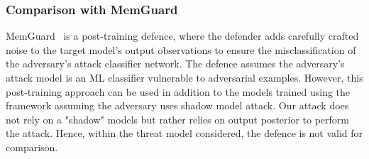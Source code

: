 

\subsubsection{Comparison with MemGuard}

MemGuard~\cite{10.1145/3319535.3363201} is a post-training defence, where the defender adds carefully crafted noise to the target model's output observations to ensure the misclassification of the adversary's attack classifier network.
The defence assumes the adversary's attack model is an ML classifier vulnerable to adversarial examples.
However, this post-training approach can be used in addition to the models trained using the \method\hspace{0.02in} framework assuming the adversary uses shadow model attack.
Our attack does not rely on a "shadow" models but rather relies on output posterior to perform the attack.
Hence, within the threat model considered, the defence is not valid for comparison.
